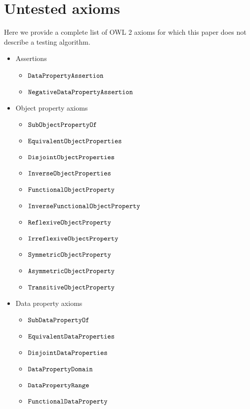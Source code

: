 \documentclass[paper.tex]{subfiles}
\begin{document}
\section{Untested axioms}
\label{app:untested}

Here we provide a complete list of OWL 2 axioms for which this paper does not describe a testing algorithm.

\begin{itemize}
  \item Assertions
  \begin{itemize}[noitemsep]
    \item $\mathtt{DataPropertyAssertion}$
    \item $\mathtt{NegativeDataPropertyAssertion}$
  \end{itemize}

  \item Object property axioms
  \begin{itemize}[noitemsep]
    \item $\mathtt{SubObjectPropertyOf}$
    \item $\mathtt{EquivalentObjectProperties}$
    \item $\mathtt{DisjointObjectProperties}$
    \item $\mathtt{InverseObjectProperties}$
    \item $\mathtt{FunctionalObjectProperty}$
    \item $\mathtt{InverseFunctionalObjectProperty}$
    \item $\mathtt{ReflexiveObjectProperty}$
    \item $\mathtt{IrreflexiveObjectProperty}$
    \item $\mathtt{SymmetricObjectProperty}$
    \item $\mathtt{AsymmetricObjectProperty}$
    \item $\mathtt{TransitiveObjectProperty}$
  \end{itemize}

  \item Data property axioms
  \begin{itemize}[noitemsep]
    \item $\mathtt{SubDataPropertyOf}$
    \item $\mathtt{EquivalentDataProperties}$
    \item $\mathtt{DisjointDataProperties}$
    \item $\mathtt{DataPropertyDomain}$
    \item $\mathtt{DataPropertyRange}$
    \item $\mathtt{FunctionalDataProperty}$
  \end{itemize}


\end{itemize}
\end{document}

